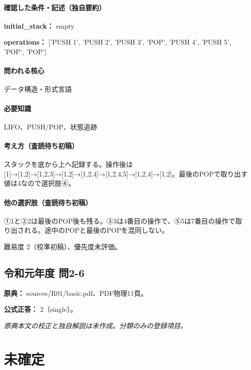 \paragraph{確認した条件・記述（独自要約）}\mbox{}\par

\noindent\textbf{initial\_stack：} empty\par

\noindent\textbf{operations：} ['PUSH 1', 'PUSH 2', 'PUSH 3', 'POP', 'PUSH 4', 'PUSH 5', 'POP', 'POP']\par

\paragraph{問われる核心} データ構造・形式言語

\paragraph{必要知識} LIFO、PUSH/POP、状態追跡

\paragraph{考え方（査読待ち初稿）} スタックを底から上へ記録する。操作後は [1]→[1,2]→[1,2,3]→[1,2]→[1,2,4]→[1,2,4,5]→[1,2,4]→[1,2]。最後のPOPで取り出す値は4なので選択肢④。

\paragraph{他の選択肢（査読待ち初稿）} ①1と②2は最後のPOP後も残る。③3は4番目の操作で、⑤5は7番目の操作で取り出される。途中のPOPと最後のPOPを混同しない。

\par 難易度 2（校準初稿）、優先度未評価。

\subsection{令和元年度 問2-6}
\label{q:r01-reg-basic-2-6}

\noindent\textbf{原典：} sources/R01/basic.pdf、PDF物理11頁。

\textbf{公式正答：} 2（single）。

\par\textit{原典本文の校正と独自解説は未作成。分類のみの登録項目。}

\section{未確定}

